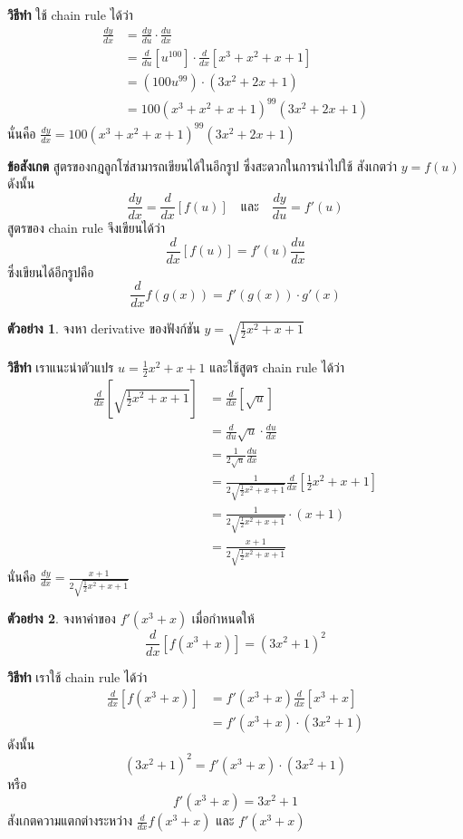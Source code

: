 \documentclass[
]{book}
\theoremstyle{definition}
\theoremstyle{definition}
\newtheorem{example}{ตัวอย่าง}[chapter]
\theoremstyle{definition}
\theoremstyle{definition}
\theoremstyle{remark}
\begin{document}
\textbf{วิธีทำ} ใช้ chain rule ได้ว่า \begin{equation}   \begin{aligned}
    \frac{dy}{dx}
    &= \frac{dy}{du} \cdot \frac{du}{dx} \\
    &= \frac{d}{du}[u^{100}] \cdot \frac{d}{dx}[x^3+x^2+x+1] \\
    &= (100u^{99}) \cdot (3x^2+2x+1) \\
    &= 100(x^3+x^2+x+1)^{99}(3x^2+2x+1)
  \end{aligned} \end{equation} นั่นคือ
\(\displaystyle \frac{dy}{dx} = 100(x^3+x^2+x+1)^{99}(3x^2+2x+1)\)

\textbf{ข้อสังเกต} สูตรของกฎลูกโซ่สามารถเขียนได้ในอีกรูป ซึ่งสะดวกในการนำไปใช้ สังเกตว่า
\(y = f(u)\) ดังนั้น
\[\frac{dy}{dx} = \frac{d}{dx}[f(u)] \quad \text{และ} \quad
    \frac{dy}{du} = f'(u)\] สูตรของ chain rule จึงเขียนได้ว่า
\[\label{E:chain2}
\boxed{
    \frac{d}{dx}[f(u)] = f'(u)\frac{du}{dx}
}\] ซึ่งเขียนได้อีกรูปคือ \[\frac{d}{dx} f(g(x)) = f'(g(x))\cdot g'(x)\]

\begin{example}
จงหา derivative ของฟังก์ชัน \(y = \sqrt{\frac{1}{2}x^2+x+1}\)
\end{example}

\textbf{วิธีทำ} เราแนะนำตัวแปร \(u = \frac{1}{2}x^2+x+1\) และใช้สูตร chain rule ได้ว่า
\begin{equation}   \begin{aligned}
    \frac{d}{dx} \left[\sqrt{\frac{1}{2}x^2+x+1} \right]
    &= \frac{d}{dx}[\sqrt{u}] \\
    &= \frac{d}{du}\sqrt{u} \cdot \frac{du}{dx} \\
    &= \frac{1}{2\sqrt{u}} \frac{du}{dx} \\
    &= \frac{1}{2\sqrt{\frac{1}{2}x^2+x+1}} \frac{d}{dx}
\left[\frac{1}{2}x^2+x+1\right] \\
    &= \frac{1}{2\sqrt{\frac{1}{2}x^2+x+1}} \cdot (x+1) \\
    &= \frac{x+1}{2\sqrt{\frac{1}{2}x^2+x+1}}
  \end{aligned} \end{equation} นั่นคือ
\(\displaystyle \frac{dy}{dx} = \frac{x+1}{2\sqrt{\frac{1}{2}x^2+x+1}}\)

\begin{example}
จงหาค่าของ \(f'(x^3+x)\) เมื่อกำหนดให้ \[\frac{d}{dx}[f(x^3+x)] = (3x^2+1)^2\]
\end{example}

\textbf{วิธีทำ} เราใช้ chain rule ได้ว่า \begin{equation}   \begin{aligned}
    \frac{d}{dx}[f(x^3+x)]
    &= f'(x^3+x) \frac{d}{dx} [x^3+x] \\
    &= f'(x^3+x) \cdot (3x^2+1)
  \end{aligned} \end{equation} ดังนั้น
\[(3x^2+1)^2 = f'(x^3+x)\cdot(3x^2+1)\] หรือ \[f'(x^3+x) = 3x^2+1\]
สังเกตความแตกต่างระหว่าง \(\displaystyle \frac{d}{dx} f(x^3+x)\) และ
\(f'(x^3+x)\)
\end{document}
